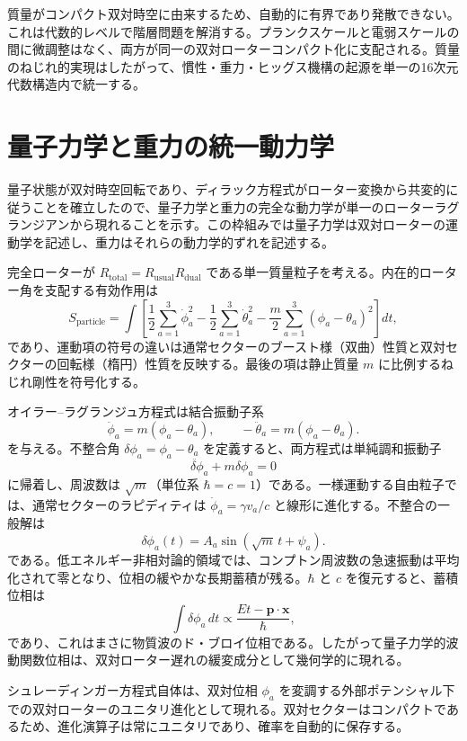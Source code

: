 \documentclass[a4paper]{article}
\begin{document}
質量がコンパクト双対時空に由来するため、自動的に有界であり発散できない。これは代数的レベルで階層問題を解消する。プランクスケールと電弱スケールの間に微調整はなく、両方が同一の双対ローターコンパクト化に支配される。質量のねじれ的実現はしたがって、慣性・重力・ヒッグス機構の起源を単一の16次元代数構造内で統一する。

\section{量子力学と重力の統一動力学}
\label{sec:dynamics}

量子状態が双対時空回転であり、ディラック方程式がローター変換から共変的に従うことを確立したので、量子力学と重力の完全な動力学が単一のローターラグランジアンから現れることを示す。この枠組みでは量子力学は双対ローターの運動学を記述し、重力はそれらの動力学的ずれを記述する。

完全ローターが $R_\text{total} = R_\text{usual} R_\text{dual}$ である単一質量粒子を考える。内在的ローター角を支配する有効作用は
\[
S_\text{particle} = \int \left[ \frac{1}{2} \sum_{a=1}^3 \dot{\phi}_a^2 - \frac{1}{2} \sum_{a=1}^3 \dot{\theta}_a^2 - \frac{m}{2} \sum_{a=1}^3 (\phi_a - \theta_a)^2 \right] dt,
\]
であり、運動項の符号の違いは通常セクターのブースト様（双曲）性質と双対セクターの回転様（楕円）性質を反映する。最後の項は静止質量 $m$ に比例するねじれ剛性を符号化する。

オイラー--ラグランジュ方程式は結合振動子系
\[
\ddot{\phi}_a = m (\phi_a - \theta_a), \qquad -\ddot{\theta}_a = m (\phi_a - \theta_a).
\]
を与える。不整合角 $\delta\phi_a = \phi_a - \theta_a$ を定義すると、両方程式は単純調和振動子
\[
\ddot{\delta\phi}_a + m \delta\phi_a = 0
\]
に帰着し、周波数は $\sqrt{m}$（単位系 $\hbar = c = 1$）である。一様運動する自由粒子では、通常セクターのラピディティは $\dot{\phi}_a = \gamma v_a/c$ と線形に進化する。不整合の一般解は
\[
\delta\phi_a(t) = A_a \sin(\sqrt{m}\, t + \psi_a).
\]
である。低エネルギー非相対論的領域では、コンプトン周波数の急速振動は平均化されて零となり、位相の緩やかな長期蓄積が残る。$\hbar$ と $c$ を復元すると、蓄積位相は
\[
\int \delta\phi_a \, dt \propto \frac{E t - \mathbf{p} \cdot \mathbf{x}}{\hbar},
\]
であり、これはまさに物質波のド・ブロイ位相である。したがって量子力学的波動関数位相は、双対ローター遅れの緩変成分として幾何学的に現れる。

シュレーディンガー方程式自体は、双対位相 $\phi_a$ を変調する外部ポテンシャル下での双対ローターのユニタリ進化として現れる。双対セクターはコンパクトであるため、進化演算子は常にユニタリであり、確率を自動的に保存する。
\end{document}
